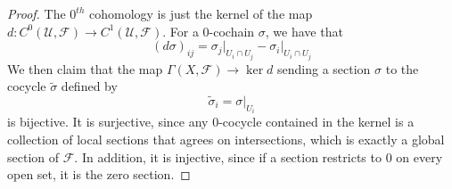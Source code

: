 \documentclass[psamsfonts, 12pt]{amsart}
\theoremstyle{definition}
\theoremstyle{remark}
\begin{document}
%
\begin{proof}
The $0^{th}$ cohomology is just the kernel of the map
$d : C^0(\mathcal{U},\mathcal{F}) \to C^1(\mathcal{U}, \mathcal{F})$.
For a $0$-cochain $\sigma$, we have that
\[
(d\sigma)_{ij} = \sigma_j\vert_{U_i \cap U_j} - \sigma_i\vert_{U_i \cap U_j}
\]
We then claim that the map $\Gamma(X, \mathcal{F}) \to \ker d$ sending a section
$\sigma$ to the cocycle $\tilde{\sigma}$ defined by
\[
\tilde{\sigma}_i = \sigma\vert_{U_i}
\]
is bijective. It is surjective, since any $0$-cocycle contained in the kernel
is a collection of local sections that agrees on intersections, which is exactly
a global section of $\mathcal{F}$. In addition, it is injective, since if
a section restricts to $0$ on every open set, it is the zero section.
\end{proof}
%
%
\end{document}
